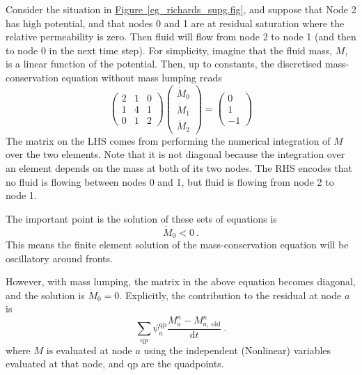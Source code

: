 \documentclass[12pt]{report}
\def\species{\kappa}
\def\d{\mathrm{d}}
\begin{document}
Consider the situation in
\hyperref[eg_richards_supg.fig]{Figure~\ref*{eg_richards_supg.fig}},
and suppose that Node 2 has high potential, and that nodes 0 and 1 are
at residual saturation where the relative permeability is zero.  Then
fluid will flow from node 2 to node 1 (and then to node 0 in the next
time step).  For simplicity, imagine that the fluid mass, $M$, is a linear
function of the potential.  Then, up to constants, the discretised
mass-conservation equation without mass lumping reads
\begin{equation}
\left(
\begin{array}{ccc}
2 & 1 & 0 \\
1 & 4 & 1 \\
0 & 1 & 2
\end{array}
\right)
\left(
\begin{array}{c}
\dot{M}_{0} \\
\dot{M}_{1} \\
\dot{M}_{2}
\end{array}
\right)
=
\left(
\begin{array}{c}
0 \\
1 \\
-1
\end{array}
\right)
\end{equation}
The matrix on the LHS comes from performing the numerical integration
of $M$ over the two elements.  Note that it is not diagonal
because the integration over an element depends on the mass at
both of its two nodes.  The RHS encodes that no fluid is flowing
between nodes 0 and 1, but fluid is flowing from node 2 to node 1.

The important point is the solution of these sets of equations is
\begin{equation}
\dot{M}_{0} < 0 \ .
\end{equation}
This means the finite element solution of the mass-conservation
equation will be oscillatory around fronts.

However, with mass lumping, the matrix in the above
equation becomes diagonal, and the solution is $\dot{M}_{0} =
0$.  Explicitly, the contribution to the residual at node $a$ is
\begin{equation}
\sum_{\mathrm{qp}}\psi_{a}^{\mathrm{qp}} \frac{M_{a}^{\species} -
  M^{\species}_{a,\ \mathrm{old}}}{\d t} \ .
\end{equation}
where $M$ is evaluated at node $a$ using the independent (Nonlinear)
variables evaluated at that node, and qp are the quadpoints.
\end{document}
